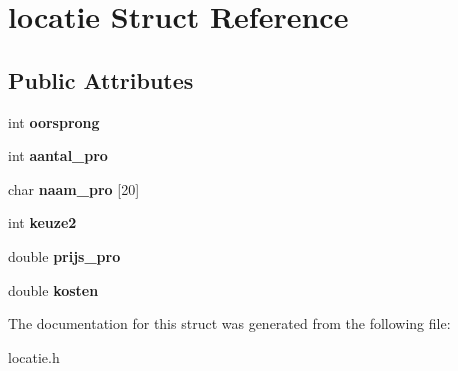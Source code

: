 \section{locatie Struct Reference}
\label{structlocatie}
\subsection*{Public Attributes}
\begin{DoxyCompactItemize}
\item 
\mbox{\label{structlocatie_af3cf8973d7d1ce1616a298c8b434ef0b}} 
int {\bfseries oorsprong}
\item 
\mbox{\label{structlocatie_af524b32492e32de73fe17640d2578119}} 
int {\bfseries aantal\+\_\+pro}
\item 
\mbox{\label{structlocatie_a1d3d7264d31e6a02f6583fb4c2090aa0}} 
char {\bfseries naam\+\_\+pro} [20]
\item 
\mbox{\label{structlocatie_a3e11bec812ff28d3846d79789b4b396d}} 
int {\bfseries keuze2}
\item 
\mbox{\label{structlocatie_ad2d5d78aaa400dff988880095135cd7b}} 
double {\bfseries prijs\+\_\+pro}
\item 
\mbox{\label{structlocatie_a65a533201ee8733234152da47e3d2c3c}} 
double {\bfseries kosten}
\end{DoxyCompactItemize}


The documentation for this struct was generated from the following file\+:\begin{DoxyCompactItemize}
\item 
locatie.\+h\end{DoxyCompactItemize}
